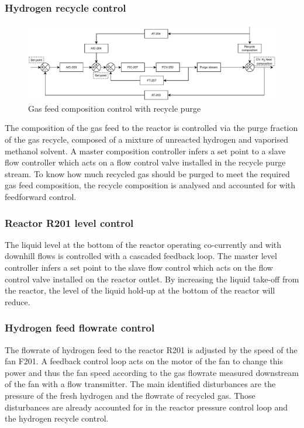 \subsubsection{Hydrogen recycle control}%
\begin{figure}
    \centering
    \includegraphics[width=\linewidth]{chapters/4-operation-control/4-Figures/V202-CC.pdf}
    \caption{Gas feed composition control with recycle purge}
    \label{fig:V202-CC}
\end{figure}
The composition of the gas feed to the reactor is controlled via the purge fraction of the gas recycle, composed of a mixture of unreacted hydrogen and vaporised methanol solvent. A master composition controller infers a set point to a slave flow controller which acts on a flow control valve installed in the recycle purge stream. To know how much recycled gas should be purged to meet the required gas feed composition, the recycle composition is analysed and accounted for with feedforward control. 



\subsubsection{Reactor R201 level control} %
The liquid level at the bottom of the reactor operating co-currently and with downhill flows is controlled with a cascaded feedback loop. The master level controller infers a set point to the slave flow control which acts on the flow control valve installed on the reactor outlet. By increasing the liquid take-off from the reactor, the level of the liquid hold-up at the bottom of the reactor will reduce.


\subsubsection{Hydrogen feed flowrate control} %
The flowrate of hydrogen feed to the reactor R201 is adjusted by the speed of the fan F201. A feedback control loop acts on the motor of the fan to change this power and thus the fan speed according to the gas flowrate measured downstream of the fan with a flow transmitter. The main identified disturbances are the pressure of the fresh hydrogen and the flowrate of recycled gas. Those disturbances are already accounted for in the reactor pressure control loop and the hydrogen recycle control. 





